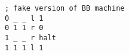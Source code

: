
\begin{verbatim}
; fake version of BB machine
0 _ _ l 1 
0 1 1 r 0
1 _ _ r halt
1 1 1 l 1
\end{verbatim}

